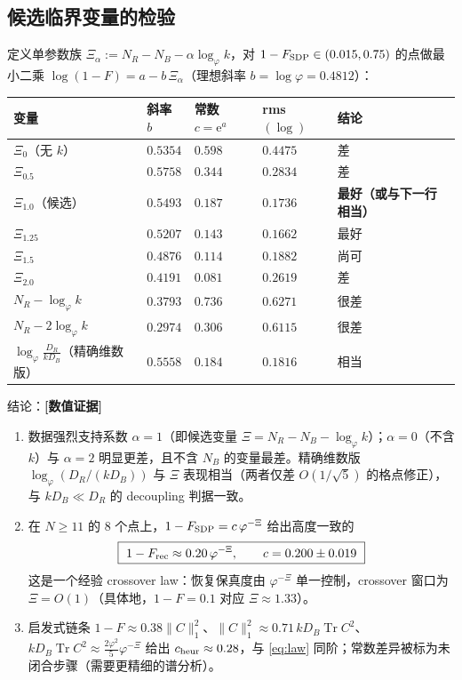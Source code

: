 \documentclass[11pt,a4paper]{ctexart}
\theoremstyle{definition}
\newcommand{\numeric}{\textcolor{blue!70!black}{\textbf{[数值证据]}}}
\newcommand{\Tr}{\operatorname{Tr}}
\newcommand{\ph}{\varphi}
\newcommand{\Frec}{F_{\rm rec}}
\newcommand{\ee}{\mathrm{e}}
\begin{document}
\subsection{候选临界变量的检验}

定义单参数族 $\Xi_\alpha:=N_R-N_B-\alpha\log_\ph k$，对 $1-F_{\rm SDP}\in(0.015,0.75)$ 的点做最小二乘
$\log(1-F)=a-b\,\Xi_\alpha$（理想斜率 $b=\log\ph=0.4812$）：

\begin{center}
\begin{tabular}{lllll}
\toprule
变量 & 斜率 $b$ & 常数 $c=\ee^{a}$ & rms$(\log)$ & 结论{}\\
\midrule
$\Xi_{0}$（无 $k$） & $0.5354$ & $0.598$ & $0.4475$ & 差 \\
$\Xi_{0.5}$ & $0.5758$ & $0.344$ & $0.2834$ & 差 \\
$\Xi_{1.0}$（候选） & $0.5493$ & $0.187$ & $\mathbf{0.1736}$ & \textbf{最好（或与下一行相当）}\\
$\Xi_{1.25}$ & $0.5207$ & $0.143$ & $\mathbf{0.1662}$ & 最好{}\\
$\Xi_{1.5}$ & $0.4876$ & $0.114$ & $0.1882$ & 尚可{}\\
$\Xi_{2.0}$ & $0.4191$ & $0.081$ & $0.2619$ & 差{}\\
\midrule
$N_R-\log_\ph k$ & $0.3793$ & $0.736$ & $0.6271$ & 很差{}\\
$N_R-2\log_\ph k$ & $0.2974$ & $0.306$ & $0.6115$ & 很差{}\\
$\log_\ph\frac{D_R}{kD_B}$（精确维数版） & $0.5558$ & $0.184$ & $0.1816$ & 相当{}\\
\bottomrule
\end{tabular}
\end{center}

\noindent 结论：\numeric{}
\begin{enumerate}[leftmargin=1.6em]
\item 数据强烈支持系数 $\alpha=1$（即候选变量 $\Xi=N_R-N_B-\log_\ph k$）；$\alpha=0$（不含 $k$）与 $\alpha=2$ 明显更差，且不含 $N_B$ 的变量最差。精确维数版 $\log_\ph(D_R/(kD_B))$ 与 $\Xi$ 表现相当（两者仅差 $O(1/\sqrt5)$ 的格点修正），与 $kD_B\ll D_R$ 的 decoupling 判据一致。
\item 在 $N\ge11$ 的 8 个点上，$1-F_{\rm SDP}=c\,\ph^{-\Xi}$ 给出高度一致的
\begin{equation}\label{eq:law}
\boxed{\ 1-\Frec\approx 0.20\,\ph^{-\Xi},\qquad c=0.200\pm0.019\ }
\end{equation}
这是一个经验 crossover law：恢复保真度由 $\ph^{-\Xi}$ 单一控制，crossover 窗口为 $\Xi=O(1)$（具体地，$1-F=0.1$ 对应 $\Xi\approx1.33$）。
\item 启发式链条 $1-F\approx0.38\|C\|_1^2$、$\|C\|_1^2\approx0.71\,kD_B\Tr C^2$、$kD_B\Tr C^2\approx\frac{2\ph^2}{5}\ph^{-\Xi}$ 给出 $c_{\rm heur}\approx0.28$，与 \eqref{eq:law} 同阶；常数差异被标为未闭合步骤（需要更精细的谱分析）。
\end{enumerate}
\end{document}
